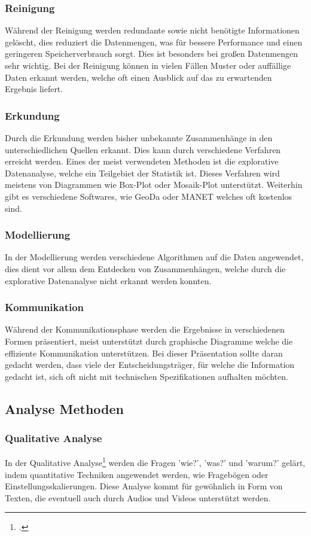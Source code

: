 \subsubsection{Reinigung}
Während der Reinigung werden redundante sowie nicht benötigte Informationen gelöscht, dies reduziert die Datenmengen, was für bessere Performance und einen geringeren Speicherverbrauch sorgt. 
Dies ist besonders bei großen Datenmengen sehr wichtig. Bei der Reinigung können in vielen Fällen Muster oder auffällige Daten erkannt werden, welche oft einen Ausblick auf das zu erwartenden Ergebnis liefert. 		
\subsubsection{Erkundung}
Durch die Erkundung werden bisher unbekannte Zusammenhänge in den unterschiedlichen Quellen erkannt. Dies kann durch verschiedene Verfahren erreicht werden.
Eines der meist verwendeten Methoden ist die explorative Datenanalyse, welche ein Teilgebiet der Statistik ist. Dieses Verfahren wird meistens von Diagrammen wie Box-Plot oder Mosaik-Plot unterstützt. Weiterhin gibt es verschiedene Softwares, wie GeoDa oder MANET welches oft kostenlos sind. 				 
\subsubsection{Modellierung}
In der Modellierung werden verschiedene Algorithmen auf die Daten angewendet, dies dient vor allem dem Entdecken von Zusammenhängen, welche durch die explorative Datenanalyse nicht erkannt werden konnten. 			
\subsubsection{Kommunikation}
Während der Kommunikationsphase werden die Ergebnisse in verschiedenen Formen präsentiert, meist unterstützt durch graphische Diagramme welche die effiziente Kommunikation unterstützen. 
Bei dieser Präsentation sollte daran gedacht werden, dass viele der Entscheidungsträger, für welche die Information gedacht ist, sich oft nicht mit technischen Spezifikationen aufhalten möchten. 		
\subsection{Analyse Methoden} 
\subsubsection{Qualitative Analyse}
In der Qualitative Analyse\footcite{analyse-methode} werden die Fragen 'wie?', 'was?' und 'warum?' gelärt, indem quantitative Techniken angewendet werden, wie Fragebögen oder Einstellungsskalierungen. 
Diese Analyse kommt für gewöhnlich in Form von Texten, die eventuell auch durch Audios und Videos unterstützt werden. 				
